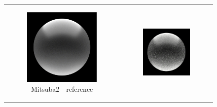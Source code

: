 \renewcommand\thesubfigure{\arabic{subfigure}}
\begin{figure}[h]
	\centering
	\begin{tabular}{cc}
		\begin{subfigure}
			{0.4\textwidth}\centering\includegraphics[width=\linewidth]{img/ggx_glass.png}
			\caption{Mitsuba2 - reference}
		\end{subfigure}
		&
		\begin{subfigure}
			{0.4\textwidth}\centering\includegraphics[width=\linewidth]{img/ggx_glass_ART.png}

\end{subfigure}
\end{tabular}
\end{figure}
